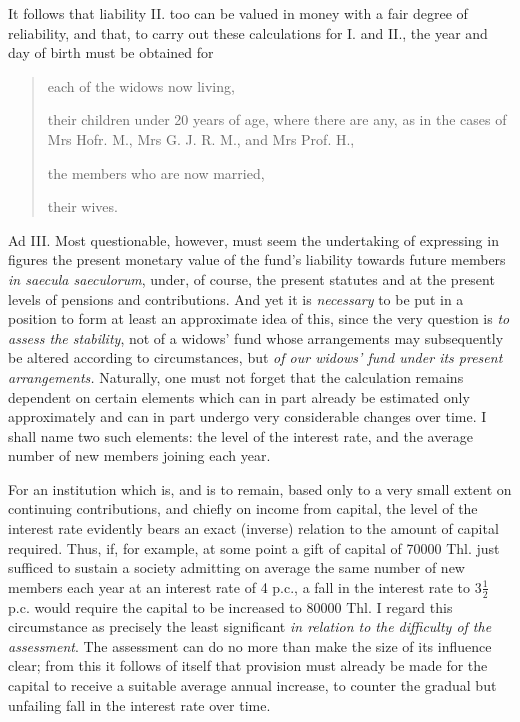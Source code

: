 \par{}
It follows that liability II. too can be valued in money with a fair degree of reliability, and that, to carry out these calculations for I. and II., the year and day of birth must be obtained for
\begin{quote}
each of the widows now living,\par
their children under 20 years of age, where there are any, as in the cases of Mrs Hofr. M., Mrs G. J. R. M., and Mrs Prof. H.,\par
the members who are now married,\par
their wives.
\end{quote}
\noindent\hspace*{\parindent}Ad III. Most questionable, however, must seem the undertaking of expressing in figures the present monetary value of the fund's liability towards future members \textit{in saecula saeculorum}, under, of course, the present statutes and at the present levels of pensions and contributions. And yet it is \textit{necessary} to be put in a position to form at least an approximate idea of this, since the very question is \textit{to assess the stability}, not of a widows' fund whose arrangements may subsequently be altered according to circumstances, but \textit{of our widows' fund under its present arrangements.} Naturally, one must not forget that the calculation remains dependent on certain elements which can in part already be estimated only approximately and can in part undergo very considerable changes over time. I shall name two such elements: the level of the interest rate, and the average number of new members joining each year.

For an institution which is, and is to remain, based only to a very small extent on continuing contributions, and chiefly on income from capital, the level of the interest rate evidently bears an exact (inverse) relation to the amount of capital required. Thus, if, for example, at some point a gift of capital of 70000 Thl. just sufficed to sustain a society admitting on average the same number of new members each year at an interest rate of 4 p.c., a fall in the interest rate to \(3\frac12\) p.c. would require the capital to be increased to 80000 Thl. I regard this circumstance as precisely the least significant \textit{in relation to the difficulty of the assessment}. The assessment can do no more than make the size of its influence clear; from this it follows of itself that provision must already be made for the capital to receive a suitable average annual increase, to counter the gradual but unfailing fall in the interest rate over time.

